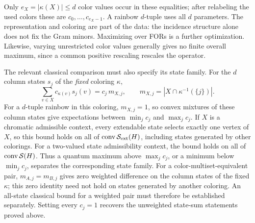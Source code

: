 \documentclass[aps,pra,reprint,superscriptaddress,longbibliography,nofootinbib,floatfix,10pt]{revtex4-2}
\theoremstyle{definition}\newtheorem{definition}[theorem]{Definition}
\theoremstyle{remark}\newtheorem{remark}[theorem]{Remark}
\newcommand{\Sc}{\mathcal S}\newcommand{\Cc}{\mathcal C}\newcommand{\Wc}{\mathcal W}
\begin{document}
Only $e_X=|\kappa(X)|\le d$ color values occur in these equalities; after relabeling the used colors these are $c_0,\ldots,c_{e_X-1}$. A rainbow $d$-tuple uses all $d$ parameters. The representation and coloring are part of the data: the incidence structure alone does not fix the Gram minors. Maximizing over FORs is a further optimization. Likewise, varying unrestricted color values generally gives no finite overall maximum, since a common positive rescaling rescales the operator.

The relevant classical comparison must also specify its state family. For the $d$ column states $s_j$ of the \emph{fixed} coloring $\kappa$,
\begin{equation}\label{eq:weighted-column-comparison}
\sum_{v\in X}c_{\kappa(v)}s_j(v)
=c_j\,m_{X,j},\qquad
m_{X,j}=|X\cap\kappa^{-1}(\{j\})|.
\end{equation}
For a $d$-tuple rainbow in this coloring, $m_{X,j}=1$, so convex mixtures of these column states give expectations between $\min_jc_j$ and $\max_jc_j$. If $X$ is a chromatic admissible context, every extendable state selects exactly one vertex of $X$, so this bound holds on all of $\conv\Sc_{\mathrm{ext}}(H)$, including states generated by other colorings. For a two-valued state admissibility context, the bound holds on all of $\conv\Sc(H)$. Thus a quantum maximum above $\max_jc_j$, or a minimum below $\min_jc_j$, separates the corresponding state family. For a color-multiset-equivalent pair, $m_{A,j}=m_{B,j}$ gives zero weighted difference on the column states of the fixed $\kappa$; this zero identity need not hold on states generated by another coloring. An all-state classical bound for a weighted pair must therefore be established separately. Setting every $c_j=1$ recovers the unweighted state-sum statements proved above.
\end{document}
